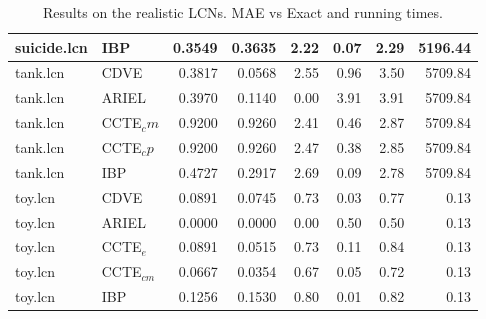 \documentclass{article}
\begin{document}
\begin{table}[t]
{\begin{tabular}{llrrrrrr}
suicide.lcn & IBP & 0.3549 & 0.3635 & 2.22 & 0.07 & 2.29 & 5196.44  \\
\hline
tank.lcn & CDVE & 0.3817 & 0.0568 & 2.55 & 0.96 & 3.50 & 5709.84  \\
tank.lcn & ARIEL & 0.3970 & 0.1140 &  0.00 & 3.91 & 3.91 & 5709.84 \\
tank.lcn & CCTE$_cm$ & 0.9200 & 0.9260 & 2.41 & 0.46 & 2.87 & 5709.84  \\
tank.lcn & CCTE$_cp$ & 0.9200 & 0.9260 & 2.47 & 0.38 & 2.85 & 5709.84  \\
tank.lcn & IBP & 0.4727 & 0.2917 & 2.69 & 0.09 & 2.78 & 5709.84  \\
\hline
toy.lcn & CDVE & 0.0891 & 0.0745 & 0.73 & 0.03 & 0.77 & 0.13  \\
toy.lcn & ARIEL & 0.0000 & 0.0000 & 0.00 & 0.50 & 0.50 & 0.13  \\
toy.lcn & CCTE$_e$ & 0.0891 & 0.0515 & 0.73 & 0.11 & 0.84 & 0.13  \\
toy.lcn & CCTE$_{cm}$ & 0.0667 & 0.0354 & 0.67 & 0.05 & 0.72 & 0.13  \\
toy.lcn & IBP & 0.1256 & 0.1530 & 0.80 & 0.01 & 0.82 & 0.13  \\
\bottomrule
\end{tabular}
}
\caption{Results on the realistic LCNs. MAE vs Exact and running times.}
\label{tab:real-all}
\end{table}
\end{document}
